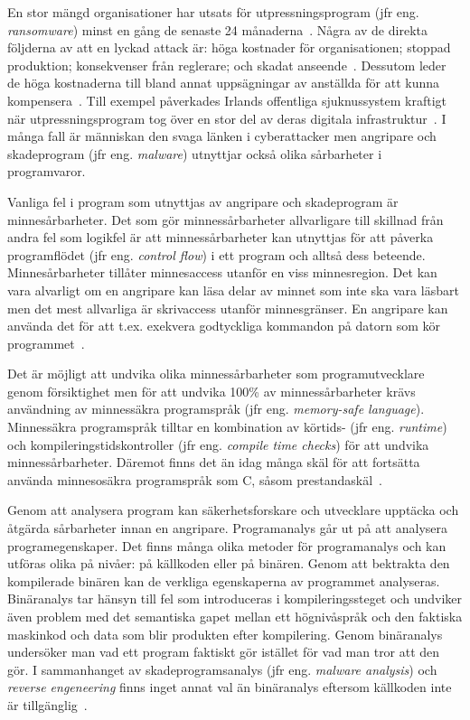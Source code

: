 En stor mängd organisationer har utsats för utpressningsprogram (jfr eng.
\emph{ransomware}) minst en gång de senaste 24 månaderna~\cite{cyberreason2021,
cyberreason2022}. Några av de direkta följderna av att en lyckad attack är: höga
kostnader för organisationen; stoppad produktion; konsekvenser från reglerare;
och skadat anseende~\cite{cyberreason2021, cyberreason2022}. Dessutom leder
de höga kostnaderna till bland annat uppsägningar av anställda för att kunna
kompensera~\cite{cyberreason2021, cyberreason2022}. Till exempel påverkades
Irlands offentliga sjuknussystem kraftigt när utpressningsprogram tog över en
stor del av deras digitala infrastruktur~\cite{hse_report, gallagher2023}. I
många fall är människan den svaga länken i cyberattacker men angripare och
skadeprogram (jfr eng. \emph{malware}) utnyttjar också olika sårbarheter i
programvaror.

Vanliga fel i program som utnyttjas av angripare och skadeprogram är
minnesårbarheter. Det som gör minnessårbarheter allvarligare till skillnad från
andra fel som logikfel är att minnessårbarheter kan utnyttjas för att påverka
programflödet (jfr eng. \emph{control flow}) i ett program och alltså dess
beteende. Minnesårbarheter tillåter minnesaccess utanför en viss minnesregion.
Det kan vara alvarligt om en angripare kan läsa delar av minnet som inte ska
vara läsbart men det mest allvarliga är skrivaccess utanför minnesgränser. En
angripare kan använda det för att t.ex. exekvera godtyckliga kommandon på
datorn som kör programmet~\cite{computer_security_cs161}.

Det är möjligt att undvika olika minnessårbarheter som
programutvecklare genom försiktighet men för att undvika 100\% av
minnessårbarheter krävs användning av minnessäkra programspråk (jfr eng.
\emph{memory-safe language}).
Minnessäkra programspråk tilltar en kombination av körtids- (jfr eng.
\emph{runtime}) och kompileringstidskontroller (jfr eng. \emph{compile time
checks}) för att undvika minnessårbarheter. Däremot finns det än idag många
skäl för att fortsätta använda minnesosäkra programspråk som
C, såsom prestandaskäl~\cite{computer_security_cs161}.

Genom att analysera program kan säkerhetsforskare och utvecklare upptäcka
och åtgärda sårbarheter innan en angripare. Programanalys går ut på att
analysera programegenskaper. Det finns många olika metoder för programanalys
och kan utföras olika på nivåer: på källkoden eller på binären. Genom att
bektrakta den kompilerade binären kan de verkliga egenskaperna av programmet
analyseras. Binäranalys tar hänsyn till fel som introduceras i
kompileringssteget och undviker även problem med det semantiska gapet mellan
ett högnivåspråk och den faktiska maskinkod och data som blir produkten efter
kompilering. Genom binäranalys undersöker man vad ett program faktiskt gör
istället för vad man tror att den gör. I sammanhanget av skadeprogramsanalys
(jfr eng. \emph{malware analysis}) och \emph{reverse engeneering} finns inget
annat val än binäranalys eftersom källkoden inte är
tillgänglig~\cite{andriesse2018}.

